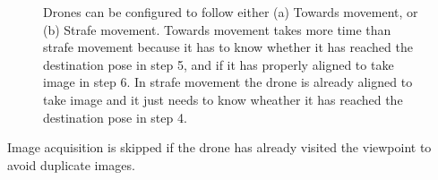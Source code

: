 \begin{figure}
	\centering
	\caption[Movement types for drones.]{\small 
		Drones can be configured to follow either (a) Towards movement, or (b) Strafe movement. Towards movement takes more time than strafe movement because it has to know whether it has reached the destination pose in step 5, and if it has properly aligned to take image in step 6. In strafe movement the drone is already aligned to take image and it just needs to know wheather it has reached the destination pose in step 4.}
	
	
	\label{fig:movement-types}
\end{figure}

Image acquisition is skipped if the drone has already visited the viewpoint to avoid duplicate images.

